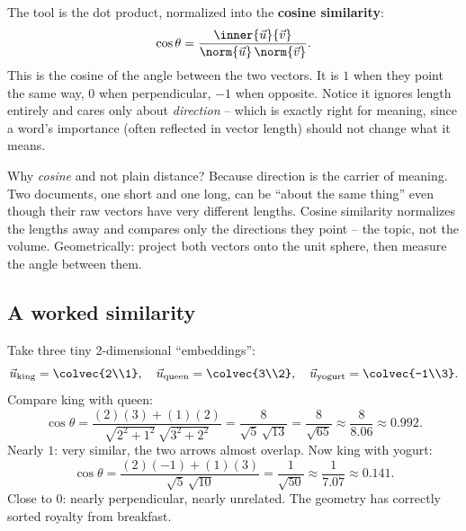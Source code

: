 The tool is the dot product, normalized into the \textbf{cosine similarity}:
\[
\cos\theta = \frac{\inner{\vec{u}}{\vec{v}}}{\norm{\vec{u}}\,\norm{\vec{v}}}.
\]
This is the cosine of the angle between the two vectors. It is $1$ when they point the
same way, $0$ when perpendicular, $-1$ when opposite. Notice it ignores length entirely
and cares only about \emph{direction} -- which is exactly right for meaning, since a
word's importance (often reflected in vector length) should not change what it means.

\begin{intuitionbox}
Why \emph{cosine} and not plain distance? Because direction is the carrier of meaning.
Two documents, one short and one long, can be ``about the same thing'' even though their
raw vectors have very different lengths. Cosine similarity normalizes the lengths away
and compares only the directions they point -- the topic, not the volume. Geometrically:
project both vectors onto the unit sphere, then measure the angle between them.
\end{intuitionbox}

\subsection{A worked similarity}

Take three tiny 2-dimensional ``embeddings'':
\[
\vec{u}_{\text{king}}=\colvec{2\\1},\quad
\vec{u}_{\text{queen}}=\colvec{3\\2},\quad
\vec{u}_{\text{yogurt}}=\colvec{-1\\3}.
\]
Compare king with queen:
\[
\cos\theta = \frac{(2)(3)+(1)(2)}{\sqrt{2^2+1^2}\,\sqrt{3^2+2^2}}
= \frac{8}{\sqrt{5}\,\sqrt{13}} = \frac{8}{\sqrt{65}} \approx \frac{8}{8.06} \approx 0.992.
\]
Nearly $1$: very similar, the two arrows almost overlap. Now king with yogurt:
\[
\cos\theta = \frac{(2)(-1)+(1)(3)}{\sqrt{5}\,\sqrt{10}}
= \frac{1}{\sqrt{50}} \approx \frac{1}{7.07}\approx 0.141.
\]
Close to $0$: nearly perpendicular, nearly unrelated. The geometry has correctly sorted
royalty from breakfast.

